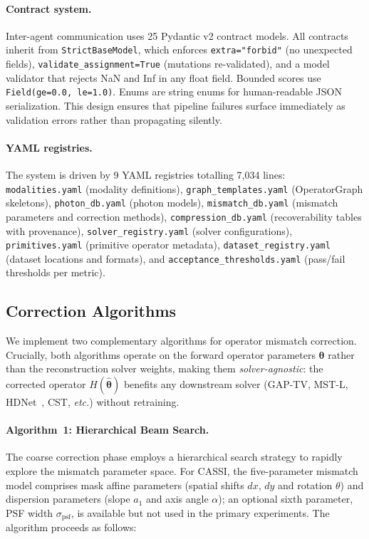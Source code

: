 \documentclass[11pt]{article}
\newcommand{\etc}{\textit{etc.}}
\begin{document}
\paragraph{Contract system.}
Inter-agent communication uses 25 Pydantic v2 contract models.  All
contracts inherit from \texttt{StrictBaseModel}, which enforces
\texttt{extra="forbid"} (no unexpected fields),
\texttt{validate\_assignment=True} (mutations re-validated), and a model
validator that rejects NaN and Inf in any float field.  Bounded scores use
\texttt{Field(ge=0.0, le=1.0)}.  Enums are string enums for human-readable
JSON serialization.  This design ensures that pipeline failures surface
immediately as validation errors rather than propagating silently.

\paragraph{YAML registries.}
The system is driven by 9 YAML registries totalling 7,034 lines:
\texttt{modalities.yaml} (modality definitions),
\texttt{graph\_templates.yaml} (OperatorGraph skeletons),
\texttt{photon\_db.yaml} (photon models),
\texttt{mismatch\_db.yaml} (mismatch parameters and correction methods),
\texttt{compression\_db.yaml} (recoverability tables with provenance),
\texttt{solver\_registry.yaml} (solver configurations),
\texttt{primitives.yaml} (primitive operator metadata),
\texttt{dataset\_registry.yaml} (dataset locations and formats), and
\texttt{acceptance\_thresholds.yaml} (pass/fail thresholds per metric).


\subsection*{Correction Algorithms}
\label{sec:methods:correction}

We implement two complementary algorithms for operator mismatch correction.
Crucially, both algorithms operate on the forward operator parameters
$\boldsymbol{\theta}$ rather than the reconstruction solver weights,
making them \emph{solver-agnostic}: the corrected operator
$H(\hat{\boldsymbol{\theta}})$ benefits any downstream solver (GAP-TV,
MST-L, HDNet~\cite{hu2022hdnet}, CST, \etc{}) without retraining.

\paragraph{Algorithm~1: Hierarchical Beam Search.}
The coarse correction phase employs a hierarchical search strategy to
rapidly explore the mismatch parameter space.  For CASSI, the five-parameter
mismatch model comprises mask affine parameters (spatial shifts $dx$, $dy$
and rotation $\theta$) and dispersion parameters (slope $a_1$ and axis
angle $\alpha$); an optional sixth parameter, PSF width $\sigma_{\text{psf}}$, is available but not used in the primary experiments.
The algorithm proceeds as follows:
\end{document}
